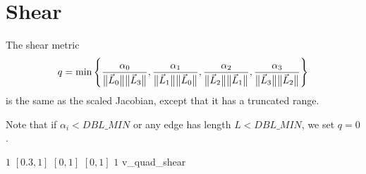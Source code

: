\section{Shear\label{s:quad-shear}}

The shear metric
\[
q = \min \left\{ \frac {\alpha_0} {\big\lVert{\vec L_0}\big\rVert \big\lVert{\vec L_3}\big\rVert}, 
                 \frac {\alpha_1} {\big\lVert{\vec L_1}\big\rVert \big\lVert{\vec L_0}\big\rVert},
                 \frac {\alpha_2} {\big\lVert{\vec L_2}\big\rVert \big\lVert{\vec L_1}\big\rVert},
                 \frac {\alpha_3} {\big\lVert{\vec L_3}\big\rVert \big\lVert{\vec L_2}\big\rVert} \right\}
\]
is the same as the scaled Jacobian, except that it has a truncated range.

Note that if $\alpha_i < DBL\_MIN$ or any edge has length $L < DBL\_MIN$, we set $q = 0$.

%
{$1$}%
{$[0.3,1]$}%
{$[0,1]$}%
{$[0,1]$}%
{$1$}%
{\cite{knu:03}}%
{v\_quad\_shear}%

